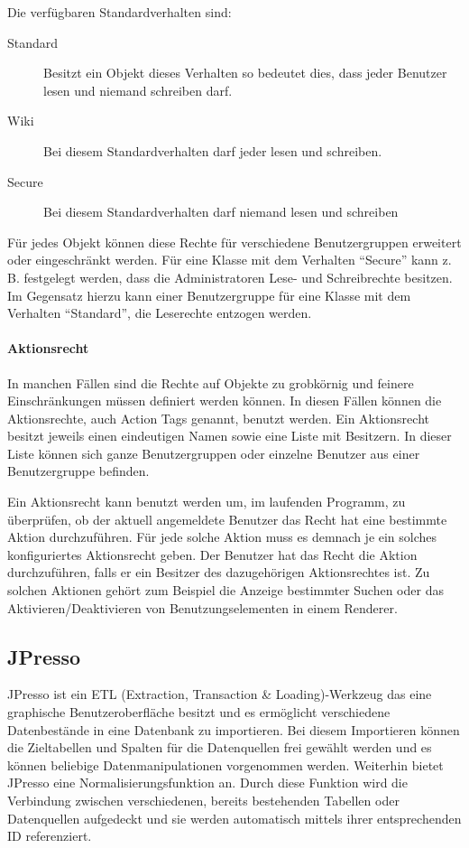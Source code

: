 Die verfügbaren Standardverhalten sind:
\begin{description}
\item[Standard] Besitzt ein Objekt dieses Verhalten so bedeutet dies, dass jeder Benutzer lesen und niemand schreiben darf.
\item[Wiki] Bei diesem Standardverhalten darf jeder lesen und schreiben.
\item[Secure] Bei diesem Standardverhalten darf niemand lesen und schreiben
\end{description}
Für jedes Objekt können diese Rechte für verschiedene Benutzergruppen erweitert oder eingeschränkt werden.
Für eine Klasse mit dem Verhalten "`Secure"' kann z.\,B. festgelegt werden, dass die Administratoren Lese- und Schreibrechte besitzen.
Im Gegensatz hierzu kann einer Benutzergruppe für eine Klasse mit dem Verhalten "`Standard"', die Leserechte entzogen werden. \autocite[vgl.][]{cismet-workshop}

\paragraph{Aktionsrecht}
In manchen Fällen sind die Rechte auf Objekte zu grobkörnig und feinere Einschränkungen müssen definiert werden können.
In diesen Fällen können die Aktionsrechte, auch Action Tags genannt, benutzt werden.
Ein Aktionsrecht besitzt jeweils einen eindeutigen Namen sowie eine Liste mit Besitzern.
In dieser Liste können sich ganze Benutzergruppen oder einzelne Benutzer aus einer Benutzergruppe befinden.

Ein Aktionsrecht kann benutzt werden um, im laufenden Programm, zu überprüfen, ob der aktuell angemeldete Benutzer das Recht hat eine bestimmte Aktion durchzuführen.
Für jede solche Aktion muss es demnach je ein solches konfiguriertes Aktionsrecht geben.
Der Benutzer hat das Recht die Aktion durchzuführen, falls er ein Besitzer des dazugehörigen Aktionsrechtes ist.
Zu solchen Aktionen gehört zum Beispiel die Anzeige bestimmter Suchen oder das Aktivieren/Deaktivieren von Benutzungselementen in einem Renderer.

\subsection{JPresso}
JPresso ist ein ETL (Extraction, Transaction \& Loading)-Werkzeug das eine graphische Benutzeroberfläche besitzt und es ermöglicht verschiedene Datenbestände in eine Datenbank zu importieren.
Bei diesem Importieren können die Zieltabellen und Spalten für die Datenquellen frei gewählt werden und es können beliebige Datenmanipulationen vorgenommen werden.
Weiterhin bietet JPresso eine Normalisierungsfunktion an.
Durch diese Funktion wird die Verbindung zwischen verschiedenen, bereits bestehenden Tabellen oder Datenquellen aufgedeckt und sie werden automatisch mittels ihrer entsprechenden ID referenziert. \autocite[vgl.][]{cismet-jpresso}

